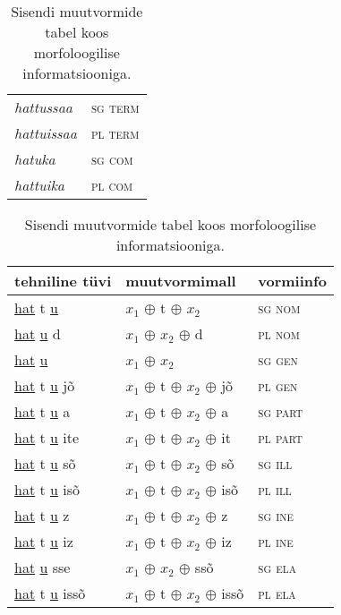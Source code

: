 \documentclass[12pt,a4paper]{article}
\begin{document}
\begin{table}[H]
\begin{minipage}[t]{.40\textwidth}
\begin{tabular}[t]{l l}
      \textit{hattussaa}  & \textsc{sg term} \\
      \textit{hattuissaa} & \textsc{pl term} \\
      \textit{hatuka}     & \textsc{sg com} \\
      \textit{hattuika}   & \textsc{pl com} \\
    \end{tabular}
    \caption{Sisendi muutvormide tabel koos morfo\-loogilise informatsiooniga.}
    \label{tab:sisendtabel-katto}
  \end{minipage}
  \hfill
  \begin{minipage}[t]{.55\textwidth}
    \centering
    \begin{tabular}[t]{l l l}
      tehniline tüvi                     & muutvormi\-mall           & vormiinfo \\
      \hline
      \underline{hat} t \underline{u}       & $x_1$ $\oplus$ t $\oplus$ $x_2$         & \textsc{sg nom} \\
      \underline{hat}   \underline{u} d     & $x_1$ $\oplus$ $x_2$ $\oplus$ d         & \textsc{pl nom} \\
      \underline{hat}   \underline{u}       & $x_1$ $\oplus$ $x_2$             & \textsc{sg gen} \\
      \underline{hat} t \underline{u} jõ    & $x_1$ $\oplus$ t $\oplus$ $x_2$ $\oplus$ jõ    & \textsc{pl gen} \\
      \underline{hat} t \underline{u} a     & $x_1$ $\oplus$ t $\oplus$ $x_2$ $\oplus$ a     & \textsc{sg part} \\
      \underline{hat} t \underline{u} ite   & $x_1$ $\oplus$ t $\oplus$ $x_2$ $\oplus$ it    & \textsc{pl part} \\
      \underline{hat} t \underline{u} sõ    & $x_1$ $\oplus$ t $\oplus$ $x_2$ $\oplus$ sõ    & \textsc{sg ill} \\
      \underline{hat} t \underline{u} isõ   & $x_1$ $\oplus$ t $\oplus$ $x_2$ $\oplus$ isõ   & \textsc{pl ill} \\
      \underline{hat} t \underline{u} z     & $x_1$ $\oplus$ t $\oplus$ $x_2$ $\oplus$ z     & \textsc{sg ine} \\
      \underline{hat} t \underline{u} iz    & $x_1$ $\oplus$ t $\oplus$ $x_2$ $\oplus$ iz    & \textsc{pl ine} \\
      \underline{hat}   \underline{u} sse   & $x_1$ $\oplus$ $x_2$ $\oplus$ ssõ       & \textsc{sg ela} \\
      \underline{hat} t \underline{u} issõ  & $x_1$ $\oplus$ t $\oplus$ $x_2$ $\oplus$ issõ  & \textsc{pl ela} \\

\end{tabular}
\end{minipage}
\end{table}
\end{document}
